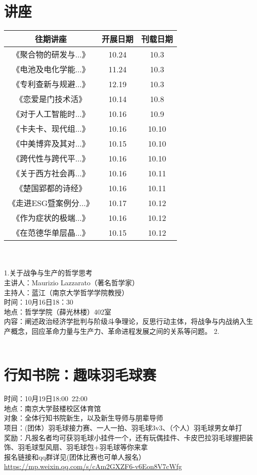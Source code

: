 \documentclass[letterpaper, 12pt]{article}
\begin{document}
\begin{multicols}{2}
\section{讲座}
\begin{tabular}{|c|c|c|}
    \hline
    往期讲座 & 开展日期 & 刊载日期\\
    \hline\hline
    《聚合物的研发与...》 & 10.24 & 10.3\\
    《电池及电化学能...》 & 11.24 & 10.3\\
    《专利查新与规避...》 & 12.19 & 10.3\\
    《恋爱是门技术活》 & 10.14 & 10.8\\
    《对于人工智能时...》 & 10.16 & 10.9\\
    《卡夫卡、现代组...》 & 10.16 & 10.10\\
    《中美博弈及其对...》 & 10.15 & 10.10\\
    《跨代性与跨代平...》 & 10.16 & 10.10\\
    《关于西方社会再...》 & 10.16 & 10.11\\
    《楚国郢都的诗经》 & 10.16 & 10.11\\
    《走进ESG暨案例分...》 & 10.17 & 10.12\\
    《作为症状的极端...》 & 10.16 & 10.12\\
    《在范德华单层晶...》 & 10.15 & 10.12\\
      \hline
\end{tabular}\\\\

1.关于战争与生产的哲学思考\\
主讲人：Maurizio Lazzarato（著名哲学家）\\
主持人：蓝江（南京大学哲学学院教授）\\
时间：10月16日18：30\\
地点：哲学学院（薛光林楼）402室\\
内容：阐述政治经济学批判与阶级斗争理论，反思行动主体，将战争与内战纳入生产概念，回应革命力量与生产力、革命进程发展之间的关系等问题。
2.\\\\

\section{行知书院：趣味羽毛球赛}
时间：10月19日18:00~22:00\\
地点：南京大学鼓楼校区体育馆\\
对象：全体行知书院新生，以及新生导师与朋辈导师\\
项目：(团体）羽毛球接力赛、一人一拍、羽毛球3v3、（个人）羽毛球男女单打\\
奖励：凡报名者均可获羽毛球小挂件一个，还有玩偶挂件、卡皮巴拉羽毛球握把装饰、羽毛球型风扇、羽毛球包+羽毛球等你来拿\\
报名链接和qq群详见(团体比赛也可单人报名）\url{https://mp.weixin.qq.com/s/cAm2GXZF6-v6Eon8V7cWfg}


\end{multicols}
\end{document}

